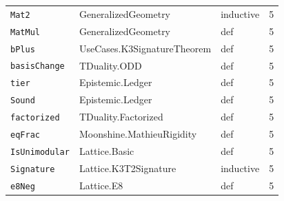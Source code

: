 \begin{longtable}{p{}p{}lr}
\texttt{\small Mat2} & {\scriptsize GeneralizedGeometry} & inductive & 5 \\
\texttt{\small MatMul} & {\scriptsize GeneralizedGeometry} & def & 5 \\
\texttt{\small bPlus} & {\scriptsize UseCases.K3SignatureTheorem} & def & 5 \\
\texttt{\small basisChange} & {\scriptsize TDuality.ODD} & def & 5 \\
\texttt{\small tier} & {\scriptsize Epistemic.Ledger} & def & 5 \\
\texttt{\small Sound} & {\scriptsize Epistemic.Ledger} & def & 5 \\
\texttt{\small factorized} & {\scriptsize TDuality.Factorized} & def & 5 \\
\texttt{\small eqFrac} & {\scriptsize Moonshine.MathieuRigidity} & def & 5 \\
\texttt{\small IsUnimodular} & {\scriptsize Lattice.Basic} & def & 5 \\
\texttt{\small Signature} & {\scriptsize Lattice.K3T2Signature} & inductive & 5 \\
\texttt{\small e8Neg} & {\scriptsize Lattice.E8} & def & 5 \\
\end{longtable}

